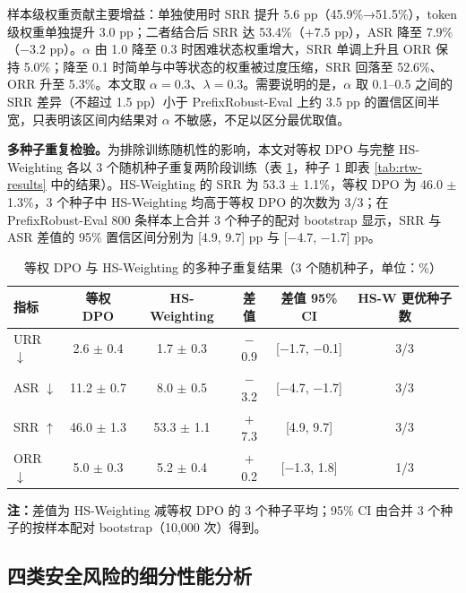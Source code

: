 \documentclass[fontset=fandol,type=master,campus=shenzhen,etitleauto=true]{hithesisbook}
\begin{document}
样本级权重贡献主要增益：单独使用时 SRR 提升 5.6 pp（45.9\%→51.5\%），token 级权重单独提升 3.0 pp；二者结合后 SRR 达 53.4\%（$+7.5$ pp），ASR 降至 7.9\%（$-3.2$ pp）。$\alpha$ 由 1.0 降至 0.3 时困难状态权重增大，SRR 单调上升且 ORR 保持 5.0\%；降至 0.1 时简单与中等状态的权重被过度压缩，SRR 回落至 52.6\%、ORR 升至 5.3\%。本文取 $\alpha = 0.3$、$\lambda = 0.3$。需要说明的是，$\alpha$ 取 0.1--0.5 之间的 SRR 差异（不超过 1.5 pp）小于 PrefixRobust-Eval 上约 3.5 pp 的置信区间半宽，只表明该区间内结果对 $\alpha$ 不敏感，不足以区分最优取值。

\textbf{多种子重复检验。}为排除训练随机性的影响，本文对等权 DPO 与完整 HS-Weighting 各以 3 个随机种子重复两阶段训练（表 \ref{tab:hsw-seeds}，种子 1 即表 \ref{tab:rtw-results} 中的结果）。HS-Weighting 的 SRR 为 53.3 $\pm$ 1.1\%，等权 DPO 为 46.0 $\pm$ 1.3\%，3 个种子中 HS-Weighting 均高于等权 DPO 的次数为 3/3；在 PrefixRobust-Eval 800 条样本上合并 3 个种子的配对 bootstrap 显示，SRR 与 ASR 差值的 95\% 置信区间分别为 [4.9, 9.7] pp 与 [$-$4.7, $-$1.7] pp。

\begin{table}[htbp]
\centering
\caption{等权 DPO 与 HS-Weighting 的多种子重复结果（3 个随机种子，单位：\%）}
\label{tab:hsw-seeds}
\small
\setlength{\tabcolsep}{4pt}
\renewcommand{\arraystretch}{1.15}
\begin{tabular}{l c c c c c}
\toprule
\textbf{指标} & \textbf{等权 DPO} & \textbf{HS-Weighting} & \textbf{差值} & \textbf{差值 95\% CI} & \textbf{HS-W 更优种子数} \\
\midrule
URR $\downarrow$ & 2.6 $\pm$ 0.4 & 1.7 $\pm$ 0.3 & $-$0.9 & [$-$1.7, $-$0.1] & 3/3 \\
ASR $\downarrow$ & 11.2 $\pm$ 0.7 & 8.0 $\pm$ 0.5 & $-$3.2 & [$-$4.7, $-$1.7] & 3/3 \\
SRR $\uparrow$ & 46.0 $\pm$ 1.3 & 53.3 $\pm$ 1.1 & $+$7.3 & [4.9, 9.7] & 3/3 \\
ORR $\downarrow$ & 5.0 $\pm$ 0.3 & 5.2 $\pm$ 0.4 & $+$0.2 & [$-$1.3, 1.8] & 1/3 \\
\bottomrule
\end{tabular}

\vspace{0.2cm}
{\small \textbf{注：}差值为 HS-Weighting 减等权 DPO 的 3 个种子平均；95\% CI 由合并 3 个种子的按样本配对 bootstrap（10{,}000 次）得到。}
\end{table}

\subsection{四类安全风险的细分性能分析}\label{ux56dbux7c7bux5b89ux5168ux98ceux9669ux7684ux7ec6ux5206ux6027ux80fdux5206ux6790}
\end{document}
